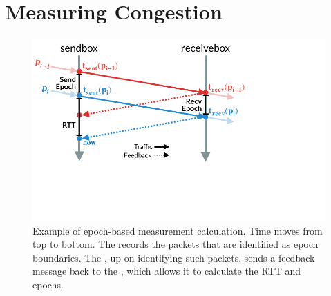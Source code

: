 \section{Measuring Congestion}\label{s:measurement}
\begin{figure}
    \centering
    \includegraphics[width=\columnwidth]{img/rate-calculation}
    \caption{Example of epoch-based measurement calculation. Time moves from top to bottom.
    The \inbox records the packets that are identified as epoch boundaries. 
    The \outbox, up on identifying such packets, sends a feedback message back to
    the \inbox, which allows it to calculate the RTT and epochs.
    }\label{fig:ratecalc}
\end{figure}





